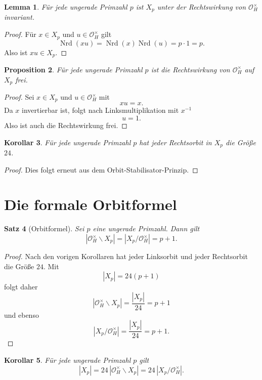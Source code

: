 \documentclass[12pt,a4paper]{article}
\theoremstyle{plain}
\newtheorem{satz}{Satz}[section]
\newtheorem{lemma}[satz]{Lemma}
\newtheorem{proposition}[satz]{Proposition}
\newtheorem{korollar}[satz]{Korollar}
\theoremstyle{definition}
\theoremstyle{remark}
\newcommand{\OH}{\mathcal O_H}
\newcommand{\nrd}{\operatorname{Nrd}}
\begin{document}
	\begin{lemma}
		Für jede ungerade Primzahl \(p\) ist \(X_p\) unter der Rechtswirkung von \(\OH^\times\) invariant.
	\end{lemma}
	
	\begin{proof}
		Für \(x\in X_p\) und \(u\in\OH^\times\) gilt
		\[
		\nrd(xu)=\nrd(x)\nrd(u)=p\cdot1=p.
		\]
		Also ist \(xu\in X_p\).
	\end{proof}
	
	\begin{proposition}
		Für jede ungerade Primzahl \(p\) ist die Rechtswirkung von \(\OH^\times\) auf \(X_p\) frei.
	\end{proposition}
	
	\begin{proof}
		Sei \(x\in X_p\) und \(u\in\OH^\times\) mit
		\[
		xu=x.
		\]
		Da \(x\) invertierbar ist, folgt nach Linksmultiplikation mit \(x^{-1}\)
		\[
		u=1.
		\]
		Also ist auch die Rechtswirkung frei.
	\end{proof}
	
	\begin{korollar}
		Für jede ungerade Primzahl \(p\) hat jeder Rechtsorbit in \(X_p\) die Größe \(24\).
	\end{korollar}
	
	\begin{proof}
		Dies folgt erneut aus dem Orbit-Stabilisator-Prinzip.
	\end{proof}
	
	\section{Die formale Orbitformel}
	
	\begin{satz}[Orbitformel]
		Sei \(p\) eine ungerade Primzahl. Dann gilt
		\[
		|\OH^\times\backslash X_p|
		=
		|X_p/\OH^\times|
		=
		p+1.
		\]
	\end{satz}
	
	\begin{proof}
		Nach den vorigen Korollaren hat jeder Linksorbit und jeder Rechtsorbit die Größe \(24\). Mit
		\[
		|X_p|=24(p+1)
		\]
		folgt daher
		\[
		|\OH^\times\backslash X_p|
		=
		\frac{|X_p|}{24}
		=
		p+1
		\]
		und ebenso
		\[
		|X_p/\OH^\times|
		=
		\frac{|X_p|}{24}
		=
		p+1.
		\]
	\end{proof}
	
	\begin{korollar}
		Für jede ungerade Primzahl \(p\) gilt
		\[
		|X_p|=24\,|\OH^\times\backslash X_p|
		=
		24\,|X_p/\OH^\times|.
		\]
	\end{korollar}
	
\end{document}
